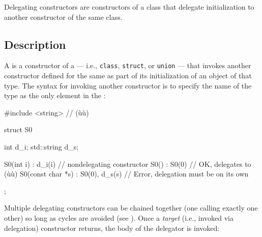 
\setcounter{table}{0}
\setcounter{footnote}{0}
\setcounter{lstlisting}{0}

Delegating constructors are constructors of a class that delegate initialization to another
constructor of the same class.

\subsection[Description]{Description}\label{description}

A  is a constructor of a
 --- i.e., \lstinline!class!, \lstinline!struct!, or
\lstinline!union! --- that invokes another constructor defined for the same
 as part of its initialization of an object of that type.
The syntax for invoking another constructor is to specify
the name of the type as the only element in the :

%
\begin{emcppslisting}
#include <string>  // (ù{}ù)

struct S0
{
  int         d_i;
  std::string d_s;

  S0(int i)         : d_i(i)        {} // nondelegating constructor
  S0()              : S0(0)         {} // OK, delegates to (ù{}ù)
  S0(const char *s) : S0(0), d_s(s) {} // Error, delegation must be on its own
};
\end{emcppslisting}

\noindent Multiple delegating constructors can be chained together (one calling
exactly one other) so long as cycles are avoided (see ).
Once a \emph{target} (i.e., invoked via delegation) constructor returns,
the body of the delegator is invoked:

